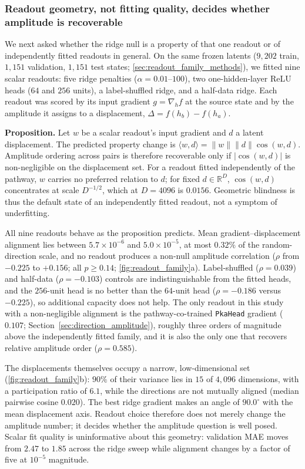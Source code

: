 \documentclass[11pt]{article}
\begin{document}
\subsubsection{Readout geometry, not fitting quality, decides whether amplitude is recoverable} We next asked whether the ridge null is a property of that one readout or of independently fitted readouts in general. On the same frozen latents ($9{,}202$ train, $1{,}151$ validation, $1{,}151$ test states; \cref{sec:readout_family_methods}), we fitted nine scalar readouts: five ridge penalties ($\alpha=0.01$--$100$), two one-hidden-layer ReLU heads ($64$ and $256$ units), a label-shuffled ridge, and a half-data ridge. Each readout was scored by its input gradient $g=\nabla_h f$ at the source state and by the amplitude it assigns to a displacement, $\Delta=f(h_b)-f(h_a)$.

\textbf{Proposition.} Let $w$ be a scalar readout's input gradient and $d$ a latent displacement. The predicted property change is $\langle w,d\rangle=\lVert w\rVert\lVert d\rVert\cos(w,d)$. Amplitude ordering across pairs is therefore recoverable only if $\lvert\cos(w,d)\rvert$ is non-negligible on the displacement set. For a readout fitted independently of the pathway, $w$ carries no preferred relation to $d$; for fixed $d\in\mathbb{R}^{D}$, $\cos(w,d)$ concentrates at scale $D^{-1/2}$, which at $D=4096$ is $0.0156$. Geometric blindness is thus the default state of an independently fitted readout, not a symptom of underfitting.

All nine readouts behave as the proposition predicts. Mean gradient--displacement alignment lies between $5.7\times10^{-6}$ and $5.0\times10^{-5}$, at most $0.32\%$ of the random-direction scale, and no readout produces a non-null amplitude correlation ($\rho$ from $-0.225$ to $+0.156$; all $p\geq0.14$; \cref{fig:readout_family}a). Label-shuffled ($\rho=0.039$) and half-data ($\rho=-0.103$) controls are indistinguishable from the fitted heads, and the $256$-unit head is no better than the $64$-unit head ($\rho=-0.186$ versus $-0.225$), so additional capacity does not help. The only readout in this study with a non-negligible alignment is the pathway-co-trained \texttt{PkaHead} gradient ($0.107$; Section~\ref{sec:direction_amplitude}), roughly three orders of magnitude above the independently fitted family, and it is also the only one that recovers relative amplitude order ($\rho=0.585$).

The displacements themselves occupy a narrow, low-dimensional set (\cref{fig:readout_family}b): $90\%$ of their variance lies in $15$ of $4{,}096$ dimensions, with a participation ratio of $6.1$, while the directions are not mutually aligned (median pairwise cosine $0.020$). The best ridge gradient makes an angle of $90.0^\circ$ with the mean displacement axis. Readout choice therefore does not merely change the amplitude number; it decides whether the amplitude question is well posed. Scalar fit quality is uninformative about this geometry: validation MAE moves from $2.47$ to $1.85$ across the ridge sweep while alignment changes by a factor of five at $10^{-5}$ magnitude.
\end{document}
